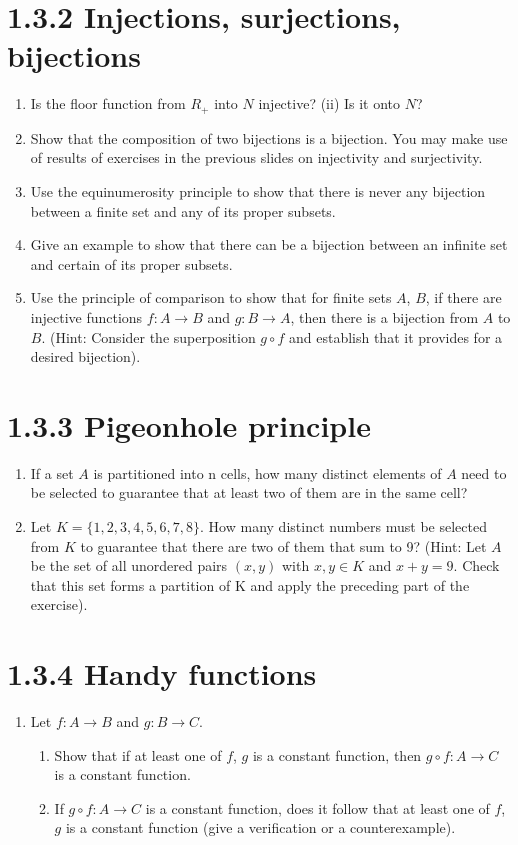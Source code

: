 \documentclass{article}
\begin{document}
\section*{1.3.2 Injections, surjections, bijections }
\begin{enumerate}
    \item Is the floor function from $R_{+}$ into $N$ injective? (ii) Is it onto $N$?
    \item Show that the composition of two bijections is a bijection. You may make use of results of exercises in the previous slides on injectivity and surjectivity.
    \item Use the equinumerosity principle to show that there is never any bijection between a finite set and any of its proper subsets.
    \item Give an example to show that there can be a bijection between an infinite set and certain of its proper subsets.
    \item Use the principle of comparison to show that for finite sets $A$, $B$, if there are injective functions $f : A \rightarrow B$ and $g: B \rightarrow A$, then there is a bijection from $A$ to $B$. (Hint: Consider the superposition $g \circ f$ and establish that it provides for a desired bijection).
\end{enumerate}

\section*{1.3.3 Pigeonhole principle}
\begin{enumerate}
    \item If a set $A$ is partitioned into n cells, how many distinct elements of $A$ need to be selected to guarantee that at least two of them are in the same cell?
    \item Let $K =\{1,2,3,4,5,6,7,8\}$. How many distinct numbers must be selected from $K$ to guarantee that there are two of them that sum to 9? (Hint: Let $A$ be the set of all unordered pairs $(x,y)$ with $x,y \in K$ and $x+y = 9$. Check that this set forms a partition of K and apply the preceding part of the exercise).
\end{enumerate}

\section*{1.3.4 Handy functions}
\begin{enumerate}
    \item Let $f: A \rightarrow B$ and $g: B \rightarrow C$.
    \begin{enumerate}
        \item Show that if at least one of $f$, $g$ is a constant function, then $g \circ f : A \rightarrow C$ is a constant function.
        \item If $g \circ f : A \rightarrow C$ is a constant function, does it follow that at least one of $f$,$g$ is a constant function (give a verification or a counterexample).
    \end{enumerate}
\end{enumerate}
\end{document}
